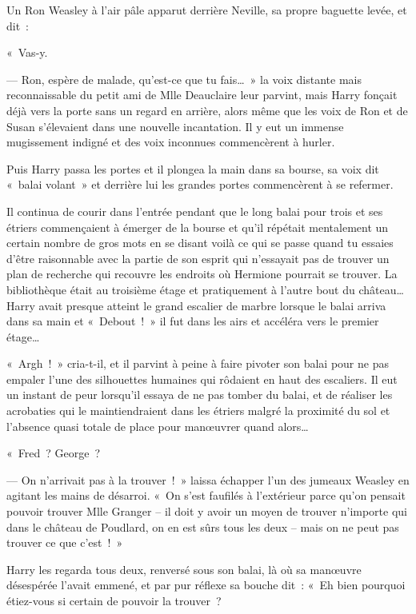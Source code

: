 Un Ron Weasley à l'air pâle apparut derrière Neville, sa propre baguette levée, et dit~:

«~Vas-y.

--- Ron, espère de malade, qu'est-ce que tu fais…~»
la voix distante mais reconnaissable du petit ami de Mlle Deauclaire leur parvint, mais Harry fonçait déjà vers la porte sans un regard en arrière, alors même que les voix de Ron et de Susan s'élevaient dans une nouvelle incantation.
Il y eut un immense mugissement indigné et des voix inconnues commencèrent à hurler.

Puis Harry passa les portes et il plongea la main dans sa bourse, sa voix dit «~balai volant~» et derrière lui les grandes portes commencèrent à se refermer.

Il continua de courir dans l'entrée pendant que le long balai pour trois et ses étriers commençaient à émerger de la bourse et qu'il répétait mentalement un certain nombre de gros mots en se disant voilà ce qui se passe quand tu essaies d'être raisonnable avec la partie de son esprit qui n'essayait pas de trouver un plan de recherche qui recouvre les endroits où Hermione pourrait se trouver.
La bibliothèque était au troisième étage et pratiquement à l'autre bout du château…
Harry avait presque atteint le grand escalier de marbre lorsque le balai arriva dans sa main et «~Debout~!~»
il fut dans les airs et accéléra vers le premier étage…

«~Argh~!~»
cria-t-il, et il parvint à peine à faire pivoter son balai pour ne pas empaler l'une des silhouettes humaines qui rôdaient en haut des escaliers.
Il eut un instant de peur lorsqu'il essaya de ne pas tomber du balai, et de réaliser les acrobaties qui le maintiendraient dans les étriers malgré la proximité du sol et l'absence quasi totale de place pour manœuvrer quand alors…

«~Fred~?
George~?

--- On n'arrivait pas à la trouver~!~»
laissa échapper l'un des jumeaux Weasley en agitant les mains de désarroi.
«~On s'est faufilés à l'extérieur parce qu'on pensait pouvoir trouver Mlle Granger -- il doit y avoir un moyen de trouver n'importe qui dans le château de Poudlard, on en est sûrs tous les deux -- mais on ne peut pas trouver ce que c'est~!~»

Harry les regarda tous deux, renversé sous son balai, là où sa manœuvre désespérée l'avait emmené, et par pur réflexe sa bouche dit~: «~Eh bien pourquoi étiez-vous si certain de pouvoir la trouver~?

